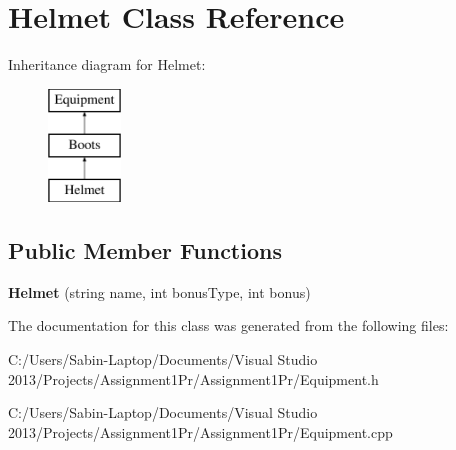 \hypertarget{class_helmet}{}\section{Helmet Class Reference}
\label{class_helmet}
Inheritance diagram for Helmet\+:\begin{figure}[H]
\begin{center}
\leavevmode
\includegraphics[height=3.000000cm]{class_helmet}
\end{center}
\end{figure}
\subsection*{Public Member Functions}
\begin{DoxyCompactItemize}
\item 
\hypertarget{class_helmet_ab1e7dea81ffb3c007a438e02fd05abba}{}\label{class_helmet_ab1e7dea81ffb3c007a438e02fd05abba} 
{\bfseries Helmet} (string name, int bonus\+Type, int bonus)
\end{DoxyCompactItemize}


The documentation for this class was generated from the following files\+:\begin{DoxyCompactItemize}
\item 
C\+:/\+Users/\+Sabin-\/\+Laptop/\+Documents/\+Visual Studio 2013/\+Projects/\+Assignment1\+Pr/\+Assignment1\+Pr/Equipment.\+h\item 
C\+:/\+Users/\+Sabin-\/\+Laptop/\+Documents/\+Visual Studio 2013/\+Projects/\+Assignment1\+Pr/\+Assignment1\+Pr/Equipment.\+cpp\end{DoxyCompactItemize}

